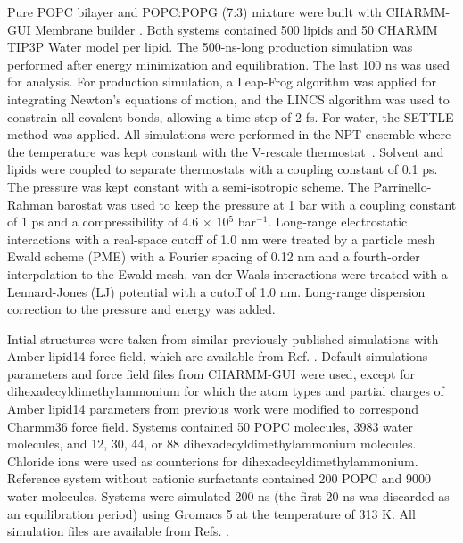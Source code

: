 \documentclass[journal=jpcbfk]{achemso}
\begin{document}
 Pure POPC bilayer and POPC:POPG (7:3) mixture were built
with CHARMM-GUI Membrane builder \cite{lee16}.
Both systems contained 500 lipids and 50 CHARMM TIP3P Water model per lipid.
The 500-ns-long production simulation was performed after energy minimization and equilibration.
The last 100 ns was used for analysis.
For production simulation, a Leap-Frog algorithm was applied for integrating Newton's equations of motion, and the LINCS algorithm was used to constrain all covalent bonds, allowing a time step of 2 fs. For water, the SETTLE method was applied. All simulations were performed in the NPT ensemble where the temperature was kept constant with the V-rescale thermostat~\cite{bussi07}.
Solvent and lipids were coupled to separate thermostats with a coupling constant of 0.1 ps. The pressure was kept constant with a semi-isotropic scheme. The Parrinello-Rahman barostat was used to keep the pressure at 1 bar with a coupling constant of 1 ps and a compressibility
of 4.6 $\times$ 10$^5$ bar$^{-1}$. Long-range electrostatic interactions with a real-space cutoff of 1.0 nm were treated by a particle mesh Ewald scheme (PME) with a Fourier spacing of 0.12 nm and a fourth-order interpolation to the Ewald mesh. van der Waals interactions were treated with a Lennard-Jones (LJ) potential with a cutoff of 1.0 nm. Long-range dispersion correction to the pressure and energy was added.



Intial structures were taken from similar previously published \cite{melcr18} simulations with Amber lipid14 force field,
which are available from Ref. .
Default simulations parameters and force field files from CHARMM-GUI \cite{lee16} were used, except for dihexadecyldimethylammonium
for which the atom types and partial charges of Amber lipid14 parameters from previous work \cite{melcr18} were modified to correspond Charmm36
force field. 
Systems contained 50 POPC molecules, 3983 water molecules, and 12, 30, 44, or 88 dihexadecyldimethylammonium molecules.
Chloride ions were used as counterions for dihexadecyldimethylammonium.
Reference system without cationic surfactants contained 200 POPC and 9000 water molecules.
Systems were simulated 200 ns (the first 20 ns was discarded as an equilibration period)
using Gromacs 5 \cite{abraham2015gromacs} at the temperature of 313 K.
All simulation files are available from Refs. .
\end{document}
